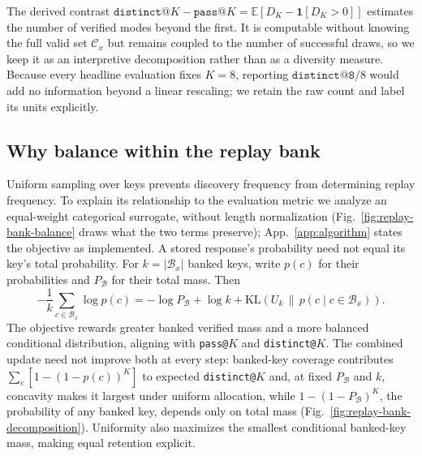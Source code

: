 \documentclass{article}
\newcommand{\1}{\mathbf 1}
\newcommand{\E}{\mathbb E}
\theoremstyle{remark}
\theoremstyle{definition}
\theoremstyle{plain}
\begin{document}
The derived contrast $\texttt{distinct@}K-\texttt{pass@}K=\E[D_K-\1[D_K>0]]$
estimates the number of verified modes beyond the first. It is computable
without knowing the full valid set $\mathcal C_x$ but remains coupled to the
number of successful draws, so we keep it as an interpretive decomposition
rather than as a diversity measure. Because every
headline evaluation fixes $K=8$, reporting $\texttt{distinct@8}/8$ would add no
information beyond a linear rescaling; we retain the raw count and label its
units explicitly.



\subsection{Why balance within the replay bank}
\label{app:replay-metric-alignment}

Uniform sampling over keys prevents discovery frequency from determining replay
frequency. To explain its relationship to the evaluation metric we analyze an
equal-weight categorical surrogate, without length normalization
(Fig.~\ref{fig:replay-bank-balance} draws what the two terms preserve);
App.~\ref{app:algorithm} states the objective as implemented.
A stored response's probability need not equal its key's total probability.
For $k=|\mathcal B_x|$ banked keys, write $p(c)$ for their probabilities and
$P_{\mathcal B}$ for their total mass. Then
\begin{equation}
 -\frac1k\sum_{c\in\mathcal B_x}\log p(c)
 =-\log P_{\mathcal B}+\log k+
   \mathrm{KL}\!\left(U_k\,\|\,
   p(c\mid c\in\mathcal B_x)\right).
 \label{eq:replay-bank-decomposition}
\end{equation}
The objective rewards greater banked verified mass and a more balanced
conditional distribution, aligning with \texttt{pass@}$K$ and
\texttt{distinct@}$K$. The combined update need not improve both at every step:
banked-key coverage contributes $\sum_c[1-(1-p(c))^K]$ to expected
\texttt{distinct@}$K$ and, at fixed $P_{\mathcal B}$ and $k$, concavity makes it
largest under uniform allocation, while $1-(1-P_{\mathcal B})^K$, the
probability of any banked key, depends only on total mass
(Fig.~\ref{fig:replay-bank-decomposition}). Uniformity also
maximizes the smallest conditional banked-key mass, making equal retention
explicit.
\end{document}
